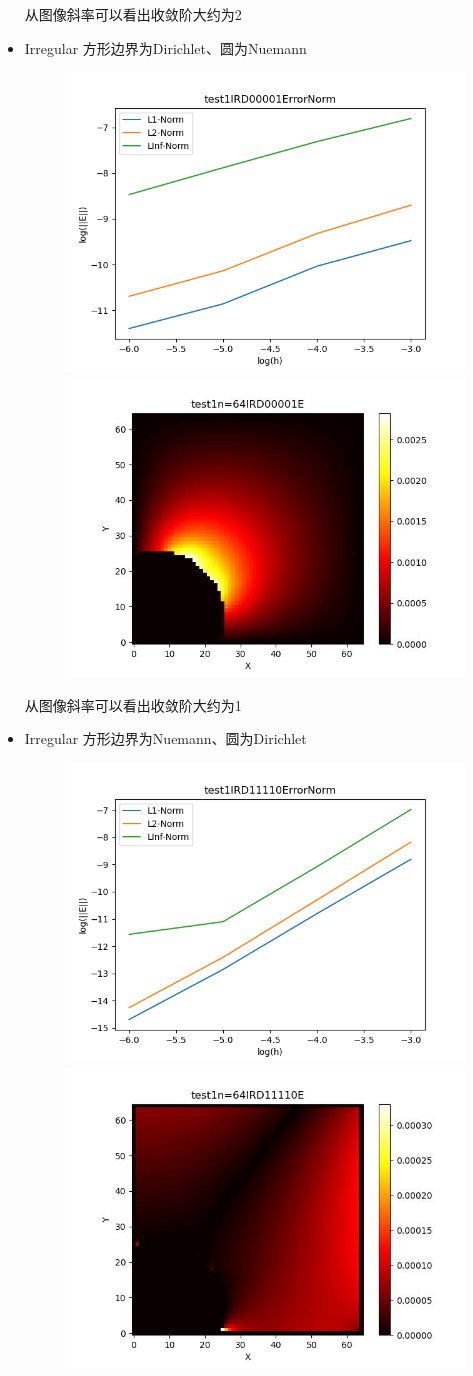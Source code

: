 \documentclass{article}
\begin{document}
\begin{itemize}
    从图像斜率可以看出收敛阶大约为2
    \item Irregular 方形边界为Dirichlet、圆为Nuemann
    \begin{figure}[h]
        \centering
        \includegraphics[width=0.35\linewidth]{test1IRD00001ErrorNormjpg.png}
        \includegraphics[width=0.35\linewidth]{test1n=64IRD00001E.jpg}
    \end{figure}

    从图像斜率可以看出收敛阶大约为1
    \item Irregular 方形边界为Nuemann、圆为Dirichlet
    \begin{figure}[h]
        \centering
        \includegraphics[width=0.35\linewidth]{test1IRD11110ErrorNormjpg.png}
        \includegraphics[width=0.35\linewidth]{test1n=64IRD11110E.jpg}
    \end{figure}


\end{itemize}
\end{document}
